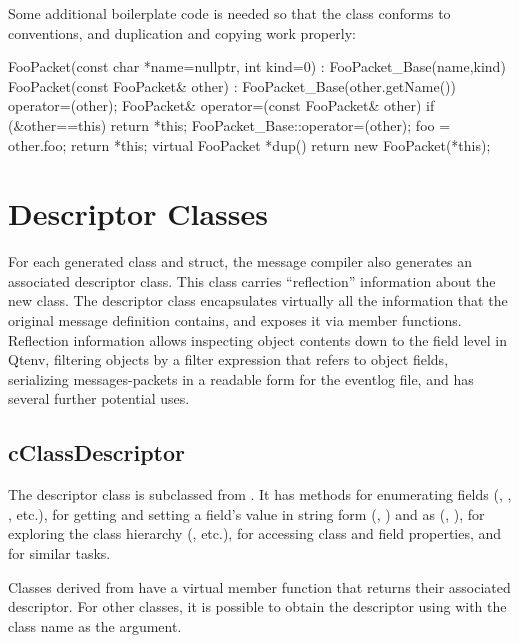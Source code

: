 Some additional boilerplate code is needed so that the class conforms
to conventions, and duplication and copying work properly:

\begin{cpp}
    FooPacket(const char *name=nullptr, int kind=0) : FooPacket_Base(name,kind) {
    }
    FooPacket(const FooPacket& other) : FooPacket_Base(other.getName()) {
        operator=(other);
    }
    FooPacket& operator=(const FooPacket& other) {
        if (&other==this) return *this;
        FooPacket_Base::operator=(other);
        foo = other.foo;
        return *this;
    }
    virtual FooPacket *dup() {
        return new FooPacket(*this);
    }
\end{cpp}


\section{Descriptor Classes}
\label{sec:msg-defs:descriptor-classes}

For each generated class and struct, the message compiler also generates an
associated descriptor class. This class carries ``reflection'' information about
the new class. The descriptor class encapsulates virtually all the information
that the original message definition contains, and exposes it via member
functions. Reflection information allows inspecting object contents down to the
field level in Qtenv, filtering objects by a filter expression that refers to
object fields, serializing messages-packets in a readable form for the eventlog
file, and has several further potential uses.


\subsection{cClassDescriptor}
\label{sec:msg-defs:cclassdescriptor}

The descriptor class is subclassed from . It has
methods for enumerating fields (, ,
, etc.), for getting and setting a field's value in
string form (, ) and as
 (, ), for
exploring the class hierarchy (, etc.), for
accessing class and field properties, and for similar tasks.

Classes derived from  have a virtual member function
 that returns their associated descriptor. For other
classes, it is possible to obtain the descriptor using
 with the class name as the argument.

